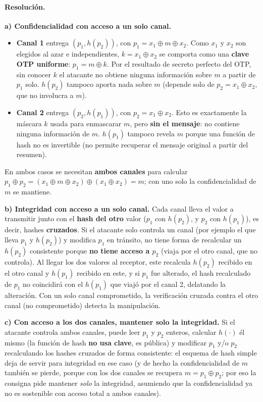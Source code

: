 \paragraph{Resolución.}

\textbf{a) Confidencialidad con acceso a un solo canal.}
\begin{itemize}
  \item \textbf{Canal 1} entrega $(p_1, h(p_2))$, con $p_1 = x_1\oplus m\oplus x_2$. Como
  $x_1$ y $x_2$ son elegidos al azar e independientes, $k = x_1\oplus x_2$ se comporta como
  una \textbf{clave OTP uniforme}: $p_1 = m \oplus k$. Por el resultado de secreto perfecto
  del OTP, sin conocer $k$ el atacante no obtiene ninguna información sobre $m$ a partir de
  $p_1$ solo. $h(p_2)$ tampoco aporta nada sobre $m$ (depende solo de $p_2 = x_1\oplus x_2$,
  que no involucra a $m$).
  \item \textbf{Canal 2} entrega $(p_2, h(p_1))$, con $p_2 = x_1\oplus x_2$. Esto es
  exactamente la máscara $k$ usada para enmascarar $m$, pero \textbf{sin el mensaje}: no
  contiene ninguna información de $m$. $h(p_1)$ tampoco revela $m$ porque una función de hash
  no es invertible (no permite recuperar el mensaje original a partir del resumen).
\end{itemize}
En ambos casos se necesitan \textbf{ambos canales} para calcular
$p_1 \oplus p_2 = (x_1\oplus m\oplus x_2)\oplus(x_1\oplus x_2) = m$; con uno solo la
confidencialidad de $m$ se mantiene.

\textbf{b) Integridad con acceso a un solo canal.}
Cada canal lleva el valor a transmitir junto con el \textbf{hash del otro} valor
($p_1$ con $h(p_2)$, y $p_2$ con $h(p_1)$), es decir, hashes \textbf{cruzados}. Si el
atacante solo controla un canal (por ejemplo el que lleva $p_1$ y $h(p_2)$) y modifica $p_1$
en tránsito, no tiene forma de recalcular un $h(p_2)$ consistente porque \textbf{no tiene
acceso a $p_2$} (viaja por el otro canal, que no controla). Al llegar los dos valores al
receptor, este recalcula $h(p_2)$ recibido en el otro canal y $h(p_1)$ recibido en este, y
si $p_1$ fue alterado, el hash recalculado de $p_1$ no coincidirá con el $h(p_1)$ que viajó
por el canal 2, delatando la alteración. Con un solo canal comprometido, la verificación
cruzada contra el otro canal (no comprometido) detecta la manipulación.

\textbf{c) Con acceso a los dos canales, mantener solo la integridad.}
Si el atacante controla ambos canales, puede leer $p_1$ y $p_2$ enteros, calcular
$h(\cdot)$ él mismo (la función de hash \textbf{no usa clave}, es pública) y modificar
$p_1$ y/o $p_2$ recalculando los hashes cruzados de forma consistente: el esquema de hash
simple deja de servir para integridad en ese caso (y de hecho la confidencialidad de $m$
también se pierde, porque con los dos canales se recupera $m = p_1\oplus p_2$; por eso la
consigna pide mantener \emph{solo} la integridad, asumiendo que la confidencialidad ya no es
sostenible con acceso total a ambos canales).

